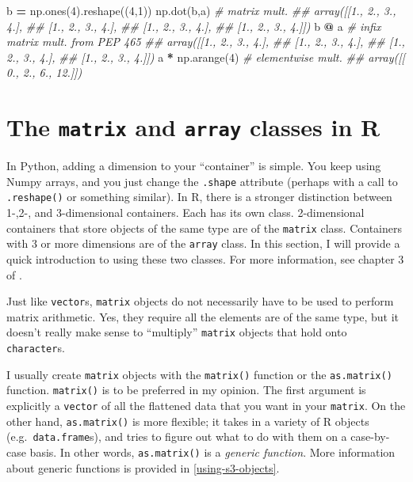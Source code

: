 \documentclass[
  12pt,
  krantz2]{krantz}
\makeatletter
\newenvironment{Shaded}{\begin{snugshade}}{\end{snugshade}}
\newcommand{\CommentTok}[1]{\textcolor[rgb]{0.37,0.37,0.37}{\textit{#1}}}
\newcommand{\DecValTok}[1]{\textcolor[rgb]{0.06,0.06,0.06}{#1}}
\newcommand{\NormalTok}[1]{#1}
\newcommand{\OperatorTok}[1]{\textcolor[rgb]{0.43,0.43,0.43}{\textbf{#1}}}
\newenvironment{kframe}{%
\medskip{}
\setlength{\fboxsep}{.8em}
 \def\at@end@of@kframe{}%
 \ifinner\ifhmode%
  \def\at@end@of@kframe{\end{minipage}}%
  \begin{minipage}{\columnwidth}%
 \fi\fi%
 \def\FrameCommand##1{\hskip\@totalleftmargin \hskip-\fboxsep
 \colorbox{shadecolor}{##1}\hskip-\fboxsep
     \hskip-\linewidth \hskip-\@totalleftmargin \hskip\columnwidth}%
 \MakeFramed {\advance\hsize-\width
   \@totalleftmargin\z@ \linewidth\hsize
   \@setminipage}}%
 {\par\unskip\endMakeFramed%
 \at@end@of@kframe}
\renewenvironment{Shaded}{\begin{kframe}}{\end{kframe}}
\makeatother
\begin{document}
\begin{Shaded}
\begin{Highlighting}[]
\NormalTok{b }\OperatorTok{=}\NormalTok{ np.ones(}\DecValTok{4}\NormalTok{).reshape((}\DecValTok{4}\NormalTok{,}\DecValTok{1}\NormalTok{)) }
\NormalTok{np.dot(b,a) }\CommentTok{\# matrix mult.}
\CommentTok{\#\# array([[1., 2., 3., 4.],}
\CommentTok{\#\#        [1., 2., 3., 4.],}
\CommentTok{\#\#        [1., 2., 3., 4.],}
\CommentTok{\#\#        [1., 2., 3., 4.]])}
\NormalTok{b }\OperatorTok{@}\NormalTok{ a }\CommentTok{\# infix matrix mult. from PEP 465}
\CommentTok{\#\# array([[1., 2., 3., 4.],}
\CommentTok{\#\#        [1., 2., 3., 4.],}
\CommentTok{\#\#        [1., 2., 3., 4.],}
\CommentTok{\#\#        [1., 2., 3., 4.]])}
\NormalTok{a }\OperatorTok{*}\NormalTok{ np.arange(}\DecValTok{4}\NormalTok{) }\CommentTok{\# elementwise mult.}
\CommentTok{\#\# array([[ 0.,  2.,  6., 12.]])}
\end{Highlighting}
\end{Shaded}

\hypertarget{the-matrix-and-array-classes-in-r}{%
\section{\texorpdfstring{The \texttt{matrix} and \texttt{array} classes in R}{The matrix and array classes in R}}\label{the-matrix-and-array-classes-in-r}}

In Python, adding a dimension to your ``container'' is simple. You keep using Numpy arrays, and you just change the \texttt{.shape} attribute (perhaps with a call to \texttt{.reshape()} or something similar). In R, there is a stronger distinction between 1-,2-, and 3-dimensional containers. Each has its own class. 2-dimensional containers that store objects of the same type are of the \texttt{matrix} class. Containers with 3 or more dimensions are of the \texttt{array} class. In this section, I will provide a quick introduction to using these two classes. For more information, see chapter 3 of \citep{matloff_r_book}.

Just like \texttt{vector}s, \texttt{matrix} objects do not necessarily have to be used to perform matrix arithmetic. Yes, they require all the elements are of the same type, but it doesn't really make sense to ``multiply'' \texttt{matrix} objects that hold onto \texttt{character}s.

I usually create \texttt{matrix} objects with the \texttt{matrix()} function or the \texttt{as.matrix()} function. \texttt{matrix()} is to be preferred in my opinion. The first argument is explicitly a \texttt{vector} of all the flattened data that you want in your \texttt{matrix}. On the other hand, \texttt{as.matrix()} is more flexible; it takes in a variety of R objects (e.g.~\texttt{data.frame}s), and tries to figure out what to do with them on a case-by-case basis. In other words, \texttt{as.matrix()} is a \emph{generic function}. More information about generic functions is provided in \ref{using-s3-objects}.
\end{document}
